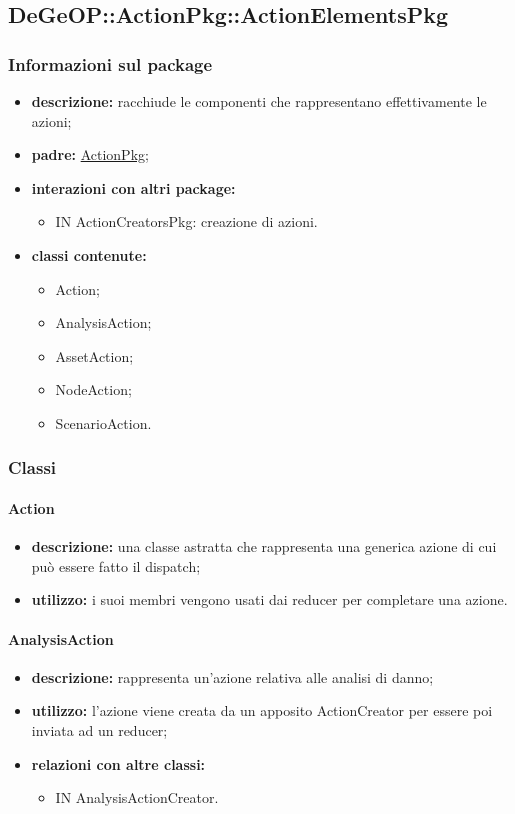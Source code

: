 \subsection{DeGeOP::ActionPkg::ActionElementsPkg}
\label{pkg::ActionElementsPkg}
\subsubsection{Informazioni sul package}
\begin{itemize}
	\item \textbf{descrizione:} racchiude le componenti che rappresentano effettivamente le azioni;
	\item \textbf{padre:} \hyperref[pkg::ActionPkg]{ActionPkg};
	\item \textbf{interazioni con altri package:} 
	\begin{itemize}
		\item IN ActionCreatorsPkg: creazione di azioni.
	\end{itemize}
	\item \textbf{classi contenute:}
	\begin{itemize}
		\item Action;
		\item AnalysisAction;
		\item AssetAction;
		\item NodeAction;
		\item ScenarioAction.
	\end{itemize}
\end{itemize}
\subsubsection{Classi}
\paragraph{Action}
\begin{itemize}
	\item \textbf{descrizione:} una classe astratta che rappresenta una generica azione di cui può essere fatto il dispatch;
	\item \textbf{utilizzo:} i suoi membri vengono usati dai reducer per completare una azione.
\end{itemize}
\paragraph{AnalysisAction}
\begin{itemize}
	\item \textbf{descrizione:} rappresenta un'azione relativa alle analisi di danno;
	\item \textbf{utilizzo:} l'azione viene creata da un apposito ActionCreator per essere poi inviata ad un reducer;
	\item \textbf{relazioni con altre classi:} 
	\begin{itemize}
		\item IN AnalysisActionCreator.
	\end{itemize}
\end{itemize}
